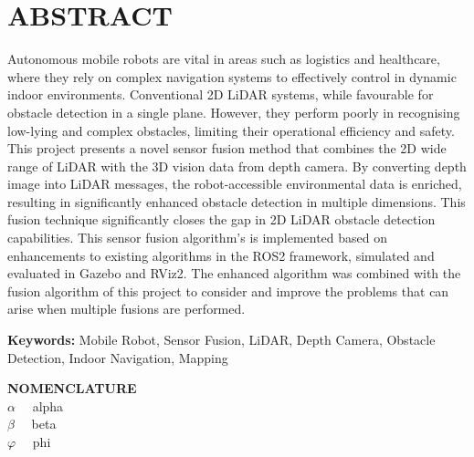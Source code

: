 \section*{ABSTRACT}
\vspace{0.5cm}
Autonomous mobile robots are vital in areas such as logistics and healthcare, where they rely on complex navigation systems to effectively control in dynamic indoor environments. Conventional 2D LiDAR systems, while favourable for obstacle detection in a single plane. However, they perform poorly in recognising low-lying and complex obstacles, limiting their operational efficiency and safety.
This project presents a novel sensor fusion method that combines the 2D wide range of LiDAR with the 3D vision data from depth camera. By converting depth image into LiDAR messages, the robot-accessible environmental data is enriched, resulting in significantly enhanced obstacle detection in multiple dimensions. This fusion technique significantly closes the gap in 2D LiDAR obstacle detection capabilities.
This sensor fusion algorithm's is implemented based on enhancements to existing algorithms in the ROS2 framework, simulated and evaluated in Gazebo and RViz2. The enhanced algorithm was combined with the fusion algorithm of this project to consider and improve the problems that can arise when multiple fusions are performed.
\vspace{0.5cm}

\textbf{Keywords:} Mobile Robot, Sensor Fusion, LiDAR, Depth Camera, Obstacle Detection, Indoor Navigation, Mapping

\vspace{0.5cm}
\textbf{NOMENCLATURE}
\\
$\alpha \quad$ alpha
\\
$\beta \quad$ beta
\\
$\varphi \quad$ phi